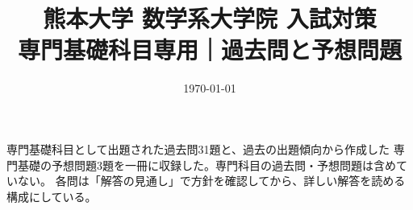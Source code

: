\documentclass[uplatex, dvipdfmx]{jsreport}
\title{熊本大学 数学系大学院 入試対策\\{\Large 専門基礎科目専用｜過去問と予想問題}}
\author{}
\date{\today}
\begin{document}
\maketitle

\begin{memo*}
専門基礎科目として出題された過去問31題と、過去の出題傾向から作成した
専門基礎の予想問題3題を一冊に収録した。専門科目の過去問・予想問題は含めていない。
各問は「解答の見通し」で方針を確認してから、詳しい解答を読める構成にしている。
\end{memo*}

\tableofcontents








\end{document}
